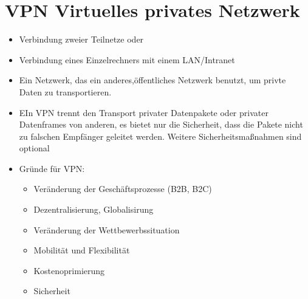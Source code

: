 \section*{VPN Virtuelles privates Netzwerk}
\cite[S. 372-378]{zisler2018computer}
\begin{itemize}
  \item Verbindung zweier Teilnetze oder
  \item Verbindung eines Einzelrechners mit einem LAN/Intranet
\end{itemize}

\cite{lipp2007vpn}
\begin{itemize}
  \item Ein Netzwerk, das ein anderes,öffentliches Netzwerk benutzt, um privte Daten zu transportieren. 
  \item EIn VPN trennt den Transport privater Datenpakete oder privater Datenframes von anderen, es bietet nur die Sicherheit, dass die Pakete nicht zu falschen Empfänger geleitet werden. Weitere Sicherheitsmaßnahmen sind optional
  \item Gründe für VPN: \begin{itemize}
  						\item Veränderung der Geschäftsprozesse (B2B, B2C)
  						\item Dezentralisierung, Globalisirung
  						\item Veränderung der Wettbewerbssituation
  						\item Mobilität und Flexibilität
  						\item Kostenoprimierung
  						\item Sicherheit
						\end{itemize}
						

\end{itemize}
